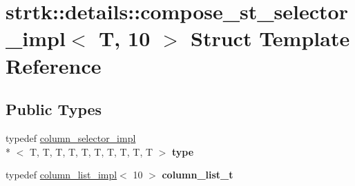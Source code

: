 \hypertarget{structstrtk_1_1details_1_1compose__st__selector__impl_3_01T_00_0110_01_4}{\section{strtk\-:\-:details\-:\-:compose\-\_\-st\-\_\-selector\-\_\-impl$<$ T, 10 $>$ Struct Template Reference}
\label{structstrtk_1_1details_1_1compose__st__selector__impl_3_01T_00_0110_01_4}
}
\subsection*{Public Types}
\begin{DoxyCompactItemize}
\item 
\hypertarget{structstrtk_1_1details_1_1compose__st__selector__impl_3_01T_00_0110_01_4_aefc02595f88feb8045d59a3eae39974d}{typedef \hyperlink{classstrtk_1_1details_1_1column__selector__impl}{column\-\_\-selector\-\_\-impl}\\*
$<$ T, T, T, T, T, T, T, T, T, T $>$ {\bfseries type}}\label{structstrtk_1_1details_1_1compose__st__selector__impl_3_01T_00_0110_01_4_aefc02595f88feb8045d59a3eae39974d}

\item 
\hypertarget{structstrtk_1_1details_1_1compose__st__selector__impl_3_01T_00_0110_01_4_ae8d7d9aa6ae1ade678b1ae67efe28b2c}{typedef \hyperlink{structstrtk_1_1details_1_1column__list__impl}{column\-\_\-list\-\_\-impl}$<$ 10 $>$ {\bfseries column\-\_\-list\-\_\-t}}\label{structstrtk_1_1details_1_1compose__st__selector__impl_3_01T_00_0110_01_4_ae8d7d9aa6ae1ade678b1ae67efe28b2c}

\end{DoxyCompactItemize}
